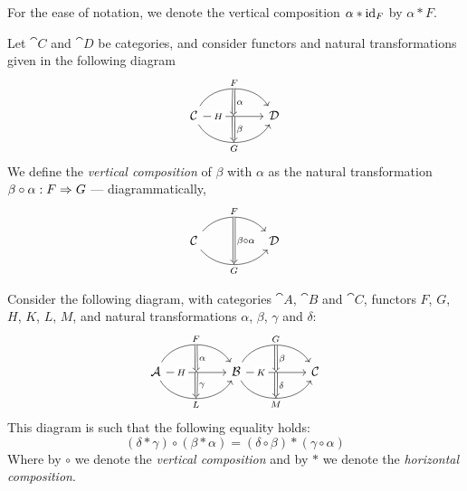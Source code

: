\begin{notation}
\label{not:horizontal-composition}
For the ease of notation, we denote the vertical composition \(\alpha * \operatorname{id}_F\)
by \(\alpha * F\).
\end{notation}

\begin{definition}
\label{def:vertical-compostion-natural-transformation}
Let \(\cat C\) and \(\cat D\) be categories, and consider functors and natural
transformations given in the following diagram
\[
  \begin{tikzcd}
  \cat C \ar[rr, bend left=60, "F"{name=F}]
  \ar[rr, "H"{near start, description}, ""'{name=H}, ""{name=HH}]
  \ar[rr, bend right=60, swap, "G"{name=G}]
  & &\cat D
  \ar[Rightarrow, "\alpha", from=F, to=H]
  \ar[Rightarrow, "\beta", from=HH, to=G]
  \end{tikzcd}
\]
We define the \emph{vertical composition} of \(\beta\) with \(\alpha\) as the
natural transformation \(\beta \circ \alpha: F \Rightarrow G\) --- diagrammatically,
\[
  \begin{tikzcd}
  \cat C \ar[rr, bend left=50, "F"{name=F}]
  \ar[rr, bend right=50, swap, "G"{name=G}]
  &&\cat D
  \ar[Rightarrow, "\beta \circ \alpha", from=F, to=G]
  \end{tikzcd}
\]
\end{definition}

\begin{proposition}
\label{prop:mixing-vertical-and-horizontal-compositions}
Consider the following diagram, with categories \(\cat A\), \(\cat B\) and
\(\cat C\), functors \(F\), \(G\), \(H\), \(K\), \(L\), \(M\), and natural
transformations \(\alpha\), \(\beta\), \(\gamma\) and \(\delta\):
\[
\begin{tikzcd}
\cat A
\ar[rr, bend left=60, "F"{name=F}]
\ar[rr, "H"{description, near start}, ""'{name=H}, ""{name=HH}]
\ar[rr, bend right=60, "L"'{name=L}]
&& \cat B
\ar[rr, bend left=60, "G"{name=G}]
\ar[rr, "K"{description, near start}, ""'{name=K}, ""{name=KK}]
\ar[rr, bend right=60, "M"'{name=M}]
&&\cat C
\ar[Rightarrow, "\alpha", from=F, to=H]
\ar[Rightarrow, from=HH, to=L, "\gamma"]
\ar[Rightarrow, "\beta", from=G, to=K]
\ar[Rightarrow, from=KK, to=M, "\delta"]
\end{tikzcd}
\]
This diagram is such that the following equality holds:
\[
(\delta * \gamma) \circ (\beta * \alpha)
= (\delta \circ \beta) * (\gamma \circ \alpha)
\]
Where by \(\circ\) we denote the \emph{vertical composition} and by \(*\) we
denote the \emph{horizontal composition}.
\end{proposition}

